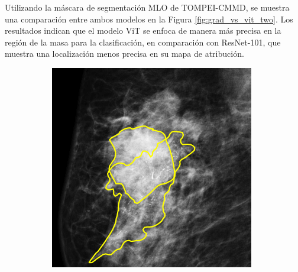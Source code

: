 \documentclass[a4paper,10pt]{book}
\begin{document}
Utilizando la máscara de segmentación MLO de TOMPEI-CMMD\cite{kashiwada_tompei-cmmd_2025}, se muestra una comparación entre ambos modelos en la Figura \ref{fig:grad_vs_vit_two}. Los resultados indican que el modelo ViT se enfoca de manera más precisa en la región de la masa para la clasificación, en comparación con ResNet-101, que muestra una localización menos precisa en su mapa de atribución.



\begin{figure}[h!]
    \centering
    \begin{subfigure}[c]{0.30\textwidth}
        \centering
        \includegraphics[width=\textwidth]{reports//assets/path.png}
        \caption{}
        \label{fig:tompei_patch}
    \end{subfigure}
    \begin{subfigure}[c]{0.30\textwidth}
        \centering

\end{subfigure}
\end{figure}
\end{document}
